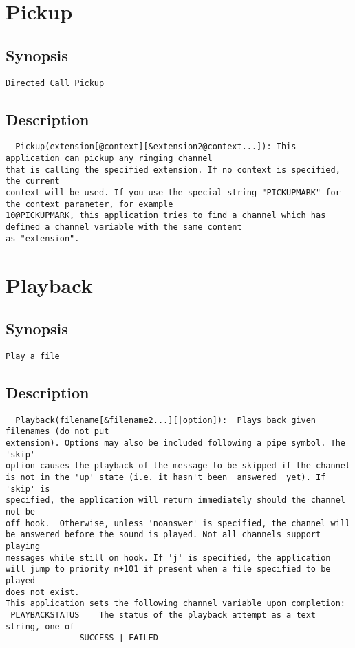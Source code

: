 \section{Pickup}
\subsection{Synopsis}
\begin{verbatim}
Directed Call Pickup
\end{verbatim}
\subsection{Description}
\begin{verbatim}
  Pickup(extension[@context][&extension2@context...]): This application can pickup any ringing channel
that is calling the specified extension. If no context is specified, the current
context will be used. If you use the special string "PICKUPMARK" for the context parameter, for example
10@PICKUPMARK, this application tries to find a channel which has defined a channel variable with the same content
as "extension".
\end{verbatim}


\section{Playback}
\subsection{Synopsis}
\begin{verbatim}
Play a file
\end{verbatim}
\subsection{Description}
\begin{verbatim}
  Playback(filename[&filename2...][|option]):  Plays back given filenames (do not put
extension). Options may also be included following a pipe symbol. The 'skip'
option causes the playback of the message to be skipped if the channel
is not in the 'up' state (i.e. it hasn't been  answered  yet). If 'skip' is 
specified, the application will return immediately should the channel not be
off hook.  Otherwise, unless 'noanswer' is specified, the channel will
be answered before the sound is played. Not all channels support playing
messages while still on hook. If 'j' is specified, the application
will jump to priority n+101 if present when a file specified to be played
does not exist.
This application sets the following channel variable upon completion:
 PLAYBACKSTATUS    The status of the playback attempt as a text string, one of
               SUCCESS | FAILED

\end{verbatim}


